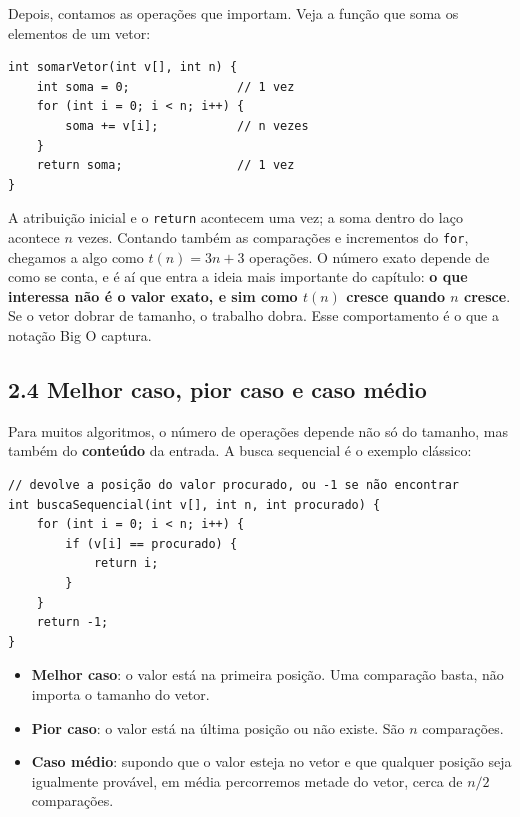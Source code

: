 Depois, contamos as operações que importam. Veja a função que soma os elementos de um vetor:

\begin{codigo}
\begin{Verbatim}[breaklines=true, breaksymbolleft={}, fontsize=\footnotesize]
int somarVetor(int v[], int n) {
    int soma = 0;               // 1 vez
    for (int i = 0; i < n; i++) {
        soma += v[i];           // n vezes
    }
    return soma;                // 1 vez
}
\end{Verbatim}
\end{codigo}

A atribuição inicial e o \texttt{return} acontecem uma vez; a soma dentro do laço acontece $n$ vezes. Contando também as comparações e incrementos do \texttt{for}, chegamos a algo como $t(n) = 3n + 3$ operações. O número exato depende de como se conta, e é aí que entra a ideia mais importante do capítulo: \textbf{o que interessa não é o valor exato, e sim como $t(n)$ cresce quando $n$ cresce}. Se o vetor dobrar de tamanho, o trabalho dobra. Esse comportamento é o que a notação Big O captura.

\subsection{2.4 Melhor caso, pior caso e caso médio}

Para muitos algoritmos, o número de operações depende não só do tamanho, mas também do \textbf{conteúdo} da entrada. A busca sequencial é o exemplo clássico:

\begin{codigo}
\begin{Verbatim}[breaklines=true, breaksymbolleft={}, fontsize=\footnotesize]
// devolve a posição do valor procurado, ou -1 se não encontrar
int buscaSequencial(int v[], int n, int procurado) {
    for (int i = 0; i < n; i++) {
        if (v[i] == procurado) {
            return i;
        }
    }
    return -1;
}
\end{Verbatim}
\end{codigo}

\begin{itemize}
  \item \textbf{Melhor caso}: o valor está na primeira posição. Uma comparação basta, não importa o tamanho do vetor.
  \item \textbf{Pior caso}: o valor está na última posição ou não existe. São $n$ comparações.
  \item \textbf{Caso médio}: supondo que o valor esteja no vetor e que qualquer posição seja igualmente provável, em média percorremos metade do vetor, cerca de $n/2$ comparações.
\end{itemize}

